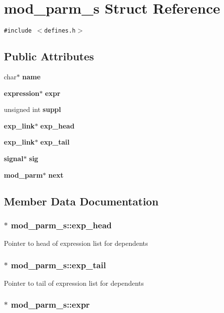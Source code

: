 \section{mod\_\-parm\_\-s  Struct Reference}
\label{structmod__parm__s}
{\tt \#include $<$defines.h$>$}

\subsection*{Public Attributes}
\begin{CompactItemize}
\item 
char$\ast$ {\bf name}
\item 
{\bf expression}$\ast$ {\bf expr}
\item 
unsigned int {\bf suppl}
\item 
{\bf exp\_\-link}$\ast$ {\bf exp\_\-head}
\item 
{\bf exp\_\-link}$\ast$ {\bf exp\_\-tail}
\item 
{\bf signal}$\ast$ {\bf sig}
\item 
{\bf mod\_\-parm}$\ast$ {\bf next}
\end{CompactItemize}


\subsection{Member Data Documentation}
\subsubsection{ $\ast$ mod\_\-parm\_\-s::exp\_\-head}\label{structmod__parm__s_m3}


Pointer to head of expression list for dependents 
\subsubsection{ $\ast$ mod\_\-parm\_\-s::exp\_\-tail}\label{structmod__parm__s_m4}


Pointer to tail of expression list for dependents 
\subsubsection{ $\ast$ mod\_\-parm\_\-s::expr}\label{structmod__parm__s_m1}


